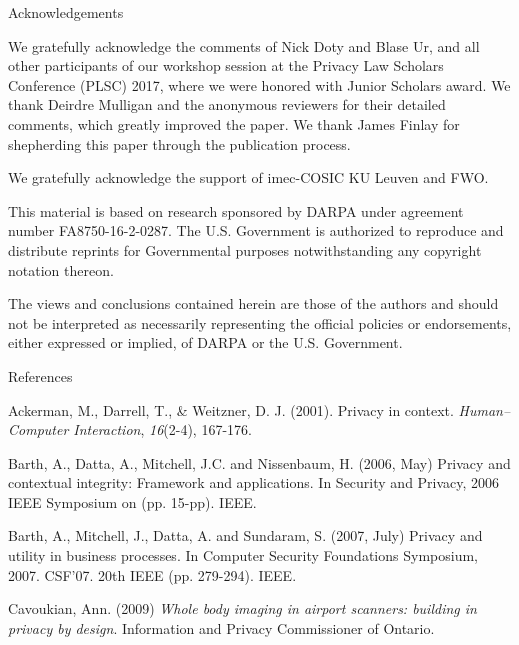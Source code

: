 \documentclass[../thesis.tex]{subfiles}
\begin{document}
Acknowledgements

We gratefully acknowledge the comments of Nick Doty and Blase Ur, and
all other participants of our workshop session at the Privacy Law
Scholars Conference (PLSC) 2017, where we were honored with Junior
Scholars award. We thank Deirdre Mulligan and the anonymous reviewers
for their detailed comments, which greatly improved the paper. We thank
James Finlay for shepherding this paper through the publication
process.


\bigskip

We gratefully acknowledge the support of imec-COSIC KU Leuven and FWO.


\bigskip

This material is based on research sponsored by DARPA under agreement
number FA8750-16-2-0287. The U.S. Government is authorized to reproduce
and distribute reprints for Governmental purposes notwithstanding any
copyright notation thereon.


\bigskip

The views and conclusions contained herein are those of the authors and
should not be interpreted as necessarily representing the official
policies or endorsements, either expressed or implied, of DARPA or the
U.S. Government.


\bigskip

References

\textcolor[rgb]{0.13333334,0.13333334,0.13333334}{Ackerman, M., Darrell,
T., \& Weitzner, D. J. (2001). Privacy in context.
}\textit{\textcolor[rgb]{0.13333334,0.13333334,0.13333334}{Human--Computer
Interaction}}\textcolor[rgb]{0.13333334,0.13333334,0.13333334}{,
}\textit{\textcolor[rgb]{0.13333334,0.13333334,0.13333334}{16}}\textcolor[rgb]{0.13333334,0.13333334,0.13333334}{(2-4),
167-176.}


\bigskip

Barth, A., Datta, A., Mitchell, J.C. and Nissenbaum, H. (2006, May)
Privacy and contextual integrity: Framework and applications. In
Security and Privacy, 2006 IEEE Symposium on (pp. 15-pp). IEEE.


\bigskip

Barth, A., Mitchell, J., Datta, A. and Sundaram, S. (2007, July) Privacy
and utility in business processes. In Computer Security Foundations
Symposium, 2007. CSF'07. 20th IEEE (pp. 279-294).
IEEE.


\bigskip

\textcolor[rgb]{0.13333334,0.13333334,0.13333334}{Cavoukian, Ann. (2009)
}\textit{\textcolor[rgb]{0.13333334,0.13333334,0.13333334}{Whole body
imaging in airport scanners: building in privacy by
design}}\textcolor[rgb]{0.13333334,0.13333334,0.13333334}{. Information
and Privacy Commissioner of Ontario.}
\end{document}
